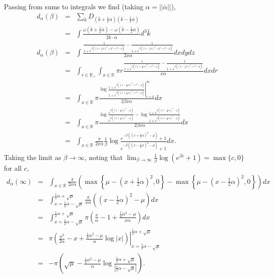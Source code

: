 \documentclass{article}
\newcommand{\beas}{\begin{eqnarray*}}
\newcommand{\enas}{\end{eqnarray*}}
\newcommand{\half}{{\frac{1}{2}}} \newcommand{\quarter}{{\frac{1}{4}}}
\newcommand{\reals}{\mathbb{R}}
\begin{document}
Passing from sums to integrals we find (taking $\alpha = ||\bar{\alpha}||$),
\beas
d_{\alpha}(\beta) &=&
\sum_{\bar{k}} D_{(\bar{k}+\half\bar{\alpha})(\bar{k}-\half\bar{\alpha})}\\
&=&
\int \frac{
\omega(\bar{k}+\half \bar{\alpha}) - \omega(\bar{k}-\half \bar{\alpha})
}{
 2 \bar{k} \cdot \bar{\alpha}
}
d^3\bar{k}\\
d_{\alpha}(\beta) &=&
\int \frac{
\frac{1}{1+e^{\beta( (x+\half\alpha)^2 + y^2 + z^2 - \mu)}}
- \frac{1}{1+e^{\beta( (x-\half\alpha)^2 + y^2 + z^2 - \mu)}}
}{
 2 x \alpha
}
dx dy dz\\
&=&
\int_{r \in \reals_+} \int_{x\in \reals}
\pi r \frac{
\frac{1}{1+e^{\beta( (x+\half\alpha)^2 + r^2 - \mu)}}
- \frac{1}{1+e^{\beta( (x-\half\alpha)^2 + r^2 - \mu)}}
}{
 x \alpha
}
dx dr\\
&=&
\int_{x\in \reals}
\pi \frac{
\left.
\log
\frac{1+e^{\beta( (x-\half\alpha)^2 + r^2 - \mu)}}
     {1+e^{\beta( (x+\half\alpha)^2 + r^2 - \mu)}}
\right|_{r=0}^\infty
}{
 2 \beta x \alpha
}
dx\\
&=&
\int_{x\in \reals}
\pi \frac{
\log
\frac{e^{\beta( (x-\half\alpha)^2 - \mu)}}
     {e^{\beta( (x+\half\alpha)^2 - \mu)}}
-
\log
\frac{1+e^{\beta( (x-\half\alpha)^2 - \mu)}}
     {1+e^{\beta( (x+\half\alpha)^2 - \mu)}}
}{
 2 \beta x \alpha
}
dx\\
&=&
\int_{x\in \reals}
\frac{\pi}{2x\alpha} \frac{1}{\beta}
\log
\frac{e^{-\beta( (x+\half\alpha)^2 - \mu)}+1}
     {e^{-\beta( (x-\half\alpha)^2 - \mu)}+1}
dx.
\enas
Taking the limit as $\beta \rightarrow \infty$, noting that
$\lim_{\beta \rightarrow \infty} \frac{1}{\beta} \log(e^{\beta c}+1)
=\max\{c,0\}$ for all $c$,
\beas
d_{\alpha}(\infty)
 &=&
\int_{x\in \reals}
\frac{\pi}{2 x \alpha}
\left(\max\left\{\mu - (x+\half\alpha)^2,0\right\}
-\max\left\{\mu - (x-\half\alpha)^2,0\right\}\right)
dx\\
 &=&
 \int_{x=\half \alpha - \sqrt{\mu}}^{\half \alpha + \sqrt{\mu}}
\frac{\pi}{x \alpha}
\left((x-\half\alpha)^2-\mu\right)
dx\\
 &=&
\int_{x=\half \alpha - \sqrt{\mu}}^{\half \alpha + \sqrt{\mu}}
\pi
\left(\frac{x}{\alpha} -1 + \frac{\frac{1}{4} \alpha^2-\mu}{x \alpha}\right)
dx\\
 &=&
\left.
\pi
\left(\frac{x^2}{2\alpha}-x + \frac{\frac{1}{4} \alpha^2-\mu}{\alpha}\log|x|\right)
\right|_{x=\half \alpha - \sqrt{\mu}}^{\half \alpha + \sqrt{\mu}}\\
 &=&
-\pi
\left(\sqrt{\mu} - \frac{\frac{1}{4} \alpha^2-\mu}{\alpha}
\log\frac{\half \alpha + \sqrt{\mu}}{\left|\half \alpha - \sqrt{\mu}\right|}
\right).
\enas
\end{document}
